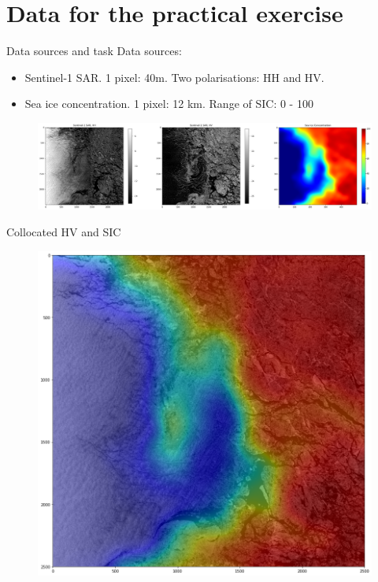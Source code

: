 \documentclass[handout]{beamer}
\begin{document}
\section{Data for the practical exercise}

\begin{frame}{Data sources and task}
    Data sources:
    \begin{itemize}
        \item Sentinel-1 SAR. 1 pixel: 40m. Two polarisations: HH and HV.
        \item Sea ice concentration. 1 pixel: 12 km. Range of SIC: 0 - 100
    \end{itemize}
    \begin{figure}
        \centering
        \includegraphics[width=.99\textwidth]{fig/L2/input_data_p5.png}
    \end{figure}
\end{frame}

\begin{frame}{Collocated HV and SIC}
    \begin{figure}
        \centering
        \includegraphics[width=.8\textwidth]{fig/L2/inp_data_p5_colocated.png}
    \end{figure}
\end{frame}
\end{document}
